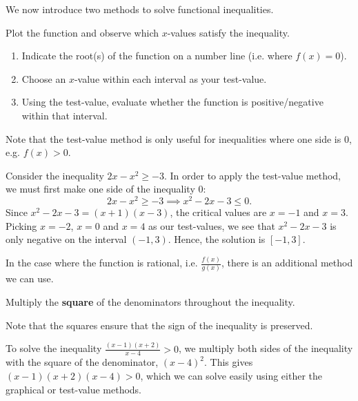 We now introduce two methods to solve functional inequalities.
\begin{method}
    Plot the function and observe which $x$-values satisfy the inequality.
\end{method}
\begin{method}
    \phantom{.}
    \renewcommand{\theenumi}{\arabic{enumi}.}%
    \begin{enumerate}
        \item Indicate the root(s) of the function on a number line (i.e. where $f(x) = 0$).
        \item Choose an $x$-value within each interval as your test-value.
        \item Using the test-value, evaluate whether the function is positive/negative within that interval.
    \end{enumerate}
    \renewcommand{\theenumi}{(\alph{enumi})}
\end{method}
Note that the test-value method is only useful for inequalities where one side is 0, e.g. $f(x) > 0$.

\begin{example}
    Consider the inequality $2x - x^2 \geq -3$. In order to apply the test-value method, we must first make one side of the inequality 0: \[2x - x^2 \geq -3 \implies x^2 - 2x - 3 \leq 0.\] Since $x^2 - 2x - 3 = (x+1)(x-3)$, the critical values are $x = -1$ and $x = 3$. Picking $x = -2$, $x = 0$ and $x = 4$ as our test-values, we see that $x^2 - 2x - 3$ is only negative on the interval $(-1, 3)$. Hence, the solution is $[-1, 3]$.
\end{example}

In the case where the function is rational, i.e. $\frac{f(x)}{g(x)}$, there is an additional method we can use.
\begin{method}
    Multiply the \textbf{square} of the denominators throughout the inequality.
\end{method}
Note that the squares ensure that the sign of the inequality is preserved.

\begin{example}
    To solve the inequality $\frac{(x-1)(x + 2)}{x - 4} > 0$, we multiply both sides of the inequality with the square of the denominator, $(x-4)^2$. This gives $(x-1)(x+2)(x-4) > 0$, which we can solve easily using either the graphical or test-value methods.
\end{example}

